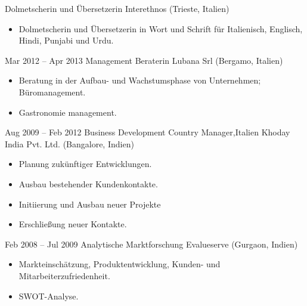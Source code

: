 \documentclass[a4paper,]{fortysecondscv}
\begin{document}
\begin{cvtable}[3]
			{Dolmetscherin und Übersetzerin}
			{Interethnos (Trieste, Italien)}
			{				
				\vspace{-\topsep}
				\begin{itemize}[nosep, leftmargin=0pt] %
					\item Dolmetscherin und Übersetzerin in Wort und Schrift für Italienisch, Englisch, Hindi, Punjabi und Urdu.
				\end{itemize}
			}
		\cvitem
			{Mar 2012 -- Apr 2013}
			{Management Beraterin}
			{Lubana Srl (Bergamo, Italien)}
			{				
				\vspace{-\topsep}
				\begin{itemize}[nosep, leftmargin=0pt] %
					\item Beratung in der Aufbau- und Wachstumsphase von Unternehmen; Büromanagement.
					\item Gastronomie management.
				\end{itemize}
			}
		\cvitem
			{Aug 2009 -- Feb 2012}
			{Business Development Country Manager,Italien}
			{Khoday India Pvt. Ltd. (Bangalore, Indien)}
			{
				\begin{itemize}[nosep, leftmargin=0pt] %
					\item Planung zukünftiger Entwicklungen.
					\item Ausbau bestehender Kundenkontakte.
					\item Initiierung und Ausbau neuer Projekte
					\item Erschließung neuer Kontakte.
				\end{itemize}
			}
		\cvitem
			{Feb 2008 -- Jul 2009}
			{Analytische Marktforschung}
			{Evalueserve (Gurgaon, Indien)}
			{
				\vspace{-\topsep}
				\begin{itemize}[nosep, leftmargin=0pt] %
					\item Markteinschätzung, Produktentwicklung, Kunden- und Mitarbeiterzufriedenheit.
					\item SWOT-Analyse.
				\end{itemize}
			}
	\end{cvtable}


\end{document}
